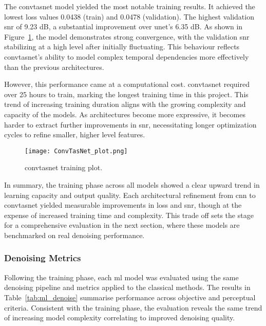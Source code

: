 The \gls{convtasnet} model yielded the most notable training results. It achieved the lowest loss values 0.0438 (train) and 0.0478 (validation). The highest validation \gls{snr} of 9.23 dB, a substantial improvement over \gls{unet}’s 6.35 dB. As shown in Figure~\ref{fig:convtasnet_training_plot}, the model demonstrates strong convergence, with the validation \gls{snr} stabilizing at a high level after initially fluctuating. This behaviour reflects \gls{convtasnet}’s ability to model complex temporal dependencies more effectively than the previous architectures.

However, this performance came at a computational cost. \gls{convtasnet} required over 25 hours to train, marking the longest training time in this project. This trend of increasing training duration aligns with the growing complexity and capacity of the models. As architectures become more expressive, it becomes harder to extract further improvements in \gls{snr}, necessitating longer optimization cycles to refine smaller, higher level features.

\begin{figure}[H]
    \centering
    \texttt{[image: ConvTasNet\_plot.png]}
    \caption{\label{fig:convtasnet_training_plot} \gls{convtasnet} training plot.}
\end{figure}

In summary, the training phase across all models showed a clear upward trend in learning capacity and output quality. Each architectural refinement from \gls{cnn} to \gls{convtasnet} yielded measurable improvements in loss and \gls{snr}, though at the expense of increased training time and complexity. This trade off sets the stage for a comprehensive evaluation in the next section, where these models are benchmarked on real denoising performance.

\subsubsection{Denoising Metrics}
\label{sec:denoising_metrics}

Following the training phase, each \gls{ml} model was evaluated using the same denoising pipeline and metrics applied to the classical methods. The results in Table~\ref{tab:ml_denoise} summarise performance across objective and perceptual criteria. Consistent with the training phase, the evaluation reveals the same trend of increasing model complexity correlating to improved denoising quality.

